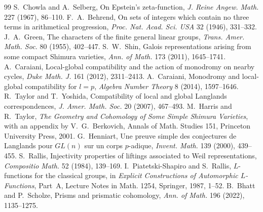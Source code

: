\documentclass[11pt]{article}
\begin{document}
\begin{thebibliography}{99}
 S.~Chowla and A.~Selberg, On Epstein's zeta-function, \emph{J. Reine Angew. Math.} 227 (1967), 86--110.
 F.~A.~Behrend, On sets of integers which contain no three terms in arithmetical progression, \emph{Proc. Nat. Acad. Sci. USA} 32 (1946), 331--332.
 J.~A.~Green, The characters of the finite general linear groups, \emph{Trans. Amer. Math. Soc.} 80 (1955), 402--447.
 S.~W.~Shin, Galois representations arising from some compact Shimura varieties, \emph{Ann. of Math.} 173 (2011), 1645--1741.
 A.~Caraiani, Local-global compatibility and the action of monodromy on nearby cycles, \emph{Duke Math. J.} 161 (2012), 2311--2413.
 A.~Caraiani, Monodromy and local-global compatibility for $l=p$, \emph{Algebra Number Theory} 8 (2014), 1597--1646.
 R.~Taylor and T.~Yoshida, Compatibility of local and global Langlands correspondences, \emph{J. Amer. Math. Soc.} 20 (2007), 467--493.
 M.~Harris and R.~Taylor, \emph{The Geometry and Cohomology of Some Simple Shimura Varieties}, with an appendix by V.~G.~Berkovich, Annals of Math. Studies 151, Princeton University Press, 2001.
 G.~Henniart, Une preuve simple des conjectures de Langlands pour $GL(n)$ sur un corps $p$-adique, \emph{Invent. Math.} 139 (2000), 439--455.
 S.~Rallis, Injectivity properties of liftings associated to Weil representations, \emph{Compositio Math.} 52 (1984), 139--169.
 I.~Piatetski-Shapiro and S.~Rallis, $L$-functions for the classical groups, in \emph{Explicit Constructions of Automorphic $L$-Functions}, Part~A, Lecture Notes in Math. 1254, Springer, 1987, 1--52.
 B.~Bhatt and P.~Scholze, Prisms and prismatic cohomology, \emph{Ann. of Math.} 196 (2022), 1135--1275.
\end{thebibliography}
\end{document}
